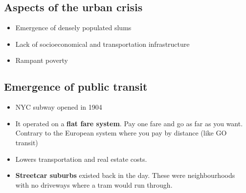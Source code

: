 \documentclass[12pt]{book}
\begin{document}
\subsection{Aspects of the urban crisis}

\begin{itemize}
    \item Emergence of densely populated slums
    \item Lack of socioeconomical and transportation infrastructure
    \item Rampant poverty
\end{itemize}

\subsection{Emergence of public transit}

\begin{itemize}
    \item NYC subway opened in 1904
    \item It operated on a \textbf{flat fare system}. Pay one fare and go as far as you want. Contrary to the European system where you pay by distance (like GO transit)
    \item Lowers transportation and real estate costs.
    \item \textbf{Streetcar suburbs} existed back in the day. These were neighbourhoods with no driveways where a tram would run through.
\end{itemize}
\end{document}
